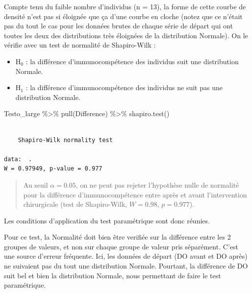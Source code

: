 \documentclass[
  a4paper,
  DIV=11,
  numbers=noendperiod,
  oneside]{scrreprt}
\newenvironment{Shaded}{}{}
\newcommand{\FunctionTok}[1]{\textcolor[rgb]{0.44,0.26,0.76}{#1}}
\newcommand{\NormalTok}[1]{\textcolor[rgb]{0.14,0.16,0.18}{#1}}
\newcommand{\SpecialCharTok}[1]{\textcolor[rgb]{0.00,0.36,0.77}{#1}}
\providecommand{\tightlist}{%
  \setlength{\itemsep}{0pt}\setlength{\parskip}{0pt}}\usepackage{longtable,booktabs,array}
\begin{document}
Compte tenu du faible nombre d'individus (n = 13), la forme de cette
courbe de densité n'est pas si éloignée que ça d'une courbe en cloche
(notez que ce n'était pas du tout le cas pour les données brutes de
chaque série de départ qui ont toutes les deux des distributions très
éloignées de la distribution Normale). On le vérifie avec un test de
normalité de Shapiro-Wilk :

\begin{itemize}
\tightlist
\item
  H\(_0\) : la différence d'immunocompétence des individus suit une
  distribution Normale.
\item
  H\(_1\) : la différence d'immunocompétence des individus ne suit pas
  une distribution Normale.
\end{itemize}

\begin{Shaded}
\begin{Highlighting}[]
\NormalTok{Testo\_large }\SpecialCharTok{\%\textgreater{}\%}
  \FunctionTok{pull}\NormalTok{(Difference) }\SpecialCharTok{\%\textgreater{}\%}
  \FunctionTok{shapiro.test}\NormalTok{()}
\end{Highlighting}
\end{Shaded}

\begin{verbatim}

    Shapiro-Wilk normality test

data:  .
W = 0.97949, p-value = 0.977
\end{verbatim}

\begin{quote}
Au seuil \(\alpha = 0.05\), on ne peut pas rejeter l'hypothèse nulle de
normalité pour la différence d'immunocompétence entre après et avant
l'intervention chirurgicale (test de Shapiro-Wilk, \(W = 0.98\),
\(p = 0.977\)).
\end{quote}

Les conditions d'application du test paramétrique sont donc réunies.

\begin{tcolorbox}[enhanced jigsaw, breakable, toprule=.15mm, colbacktitle=quarto-callout-warning-color!10!white, colframe=quarto-callout-warning-color-frame, arc=.35mm, bottomtitle=1mm, opacityback=0, title=\textcolor{quarto-callout-warning-color}{\faExclamationTriangle}\hspace{0.5em}{Attention !}, bottomrule=.15mm, colback=white, toptitle=1mm, rightrule=.15mm, leftrule=.75mm, opacitybacktitle=0.6, left=2mm, titlerule=0mm, coltitle=black]

Pour ce test, la Normalité doit bien être verifiée sur la différence
entre les 2 groupes de valeurs, et non sur chaque groupe de valeur pris
séparément. C'est une source d'erreur fréquente. Ici, les données de
départ (DO avant et DO après) ne suivaient pas du tout une distribution
Normale. Pourtant, la différence de DO suit bel et bien la distribution
Normale, nous permettant de faire le test paramétrique.

\end{tcolorbox}
\end{document}
